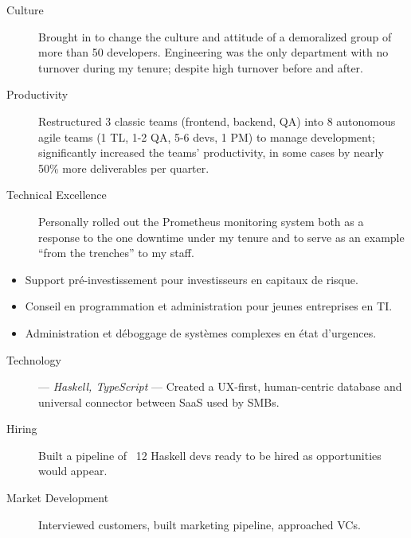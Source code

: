 \begin{langen}
\begin{description}%
\item[Culture] Brought in to change the culture and attitude of a demoralized group of more than 50 developers. Engineering was the only department with no turnover during my tenure; despite high turnover before and after.
\item[Productivity] Restructured 3 classic teams (frontend, backend, QA) into 8 autonomous agile teams (1 TL, 1-2 QA, 5-6 devs, 1 PM) to manage development; significantly increased the teams' productivity, in some cases by nearly 50\% more deliverables per quarter.
\item[Technical Excellence] Personally rolled out the Prometheus monitoring system both as a response to the one downtime under my tenure and to serve as an example ``from the trenches'' to my staff.
\end{description}
\end{langen}
\begin{langfr}
\begin{itemize}%
\item Support pr\'{e}-investissement pour investisseurs en capitaux de risque.
\item Conseil en programmation et administration pour jeunes entreprises en TI.
\item Administration et d\'{e}boggage de syst\`{e}mes complexes en \'{e}tat d'urgences.
\end{itemize}
\end{langfr}

\vspace{4 mm}

\begin{langen}
\begin{description}%
\item[Technology] --- \textit{Haskell, TypeScript} --- Created a UX-first, human-centric database and universal connector between SaaS used by SMBs.
\item[Hiring] Built a pipeline of ~12 Haskell devs ready to be hired as opportunities would appear.
\item[Market Development] Interviewed customers, built marketing pipeline, approached VCs.
\end{description}
\end{langen}

